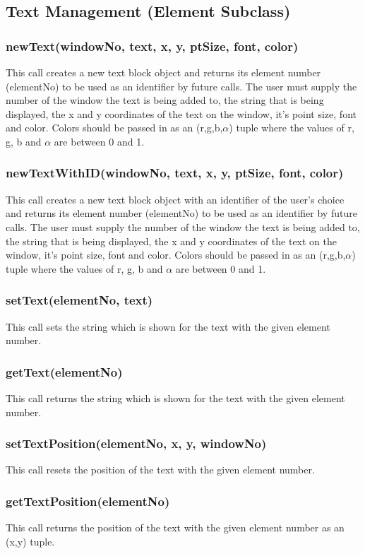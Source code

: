 \documentclass{acm_proc_article-sp}
\begin{document}
\subsection{Text Management (Element Subclass)}
\subsubsection{newText(windowNo, text, x, y, ptSize, font, color)}
This call creates a new text block object and returns its element number (elementNo) to be used as an identifier by future calls. The user must supply the number of the window the text is being added to, the string that is being displayed, the x and y coordinates of the text on the window, it's point size, font and color. Colors should be passed in as an (r,g,b,$\alpha$) tuple where the values of r, g, b and $\alpha$ are between 0 and 1.
\subsubsection{newTextWithID(windowNo, text, x, y, ptSize, font, color)}
This call creates a new text block object with an identifier of the user's choice and returns its element number (elementNo) to be used as an identifier by future calls. The user must supply the number of the window the text is being added to, the string that is being displayed, the x and y coordinates of the text on the window, it's point size, font and color. Colors should be passed in as an (r,g,b,$\alpha$) tuple where the values of r, g, b and $\alpha$ are between 0 and 1.
\subsubsection{setText(elementNo, text)}
This call sets the string which is shown for the text with the given element number.
\subsubsection{getText(elementNo)}
This call returns the string which is shown for the text with the given element number.
\subsubsection{setTextPosition(elementNo, x, y, windowNo)}
This call resets the position of the text with the given element number.
\subsubsection{getTextPosition(elementNo)}
This call returns the position of the text with the given element number as an (x,y) tuple.
\end{document}
